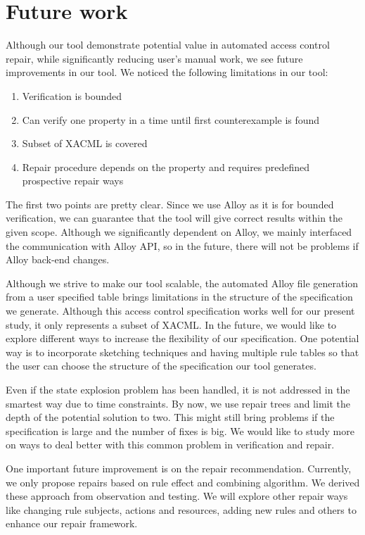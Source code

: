 \documentclass{acm_proc_article-sp}
\begin{document}
\section{Future work}

Although our tool demonstrate potential value in automated access control repair, while significantly reducing user's manual work, we see future improvements in our tool. We noticed the following limitations in our tool:

\begin{enumerate}
\item Verification is bounded
\item Can verify one property in a time until first counterexample is found
\item Subset of XACML is covered
\item Repair procedure depends on the property and requires predefined prospective repair ways
\end{enumerate}

The first two points are pretty clear. Since we use Alloy as it is for bounded verification, we can guarantee that the tool will give correct results within the given scope. Although we significantly dependent on Alloy, we mainly interfaced the communication with Alloy API, so in the future, there will not be problems if Alloy back-end changes.

Although we strive to make our tool scalable, the automated Alloy file generation from a user specified table brings limitations in the structure of the specification we generate. Although this access control specification works well for our present study, it only represents a subset of XACML. In the future, we would like to explore different ways to increase the flexibility of our specification. One potential way is to incorporate sketching techniques and having multiple rule tables so that the user can choose the structure of the specification our tool generates.

Even if the state explosion problem has been handled, it is not addressed in the smartest way due to time constraints. By now, we use repair trees and limit the depth of the potential solution to two. This might still bring problems if the specification is large and the number of fixes is big. We would like to study more on ways to deal better with this common problem in verification and repair.

One important future improvement is on the repair recommendation. Currently, we only propose repairs based on rule effect and combining algorithm. We derived these approach from observation and testing. We will explore other repair ways like changing rule subjects, actions and resources, adding new rules and others to enhance our repair framework.
\end{document}
